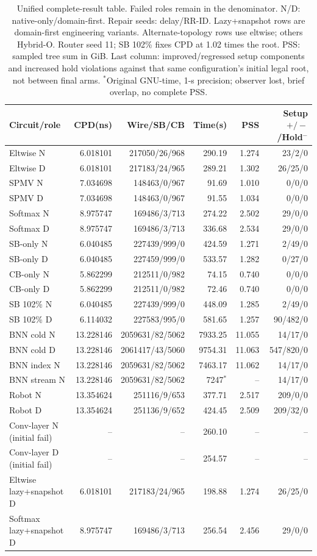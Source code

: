 \documentclass[conference,10pt]{IEEEtran}
\begin{document}
\begin{table}[t]
\centering\footnotesize\setlength{\tabcolsep}{3 pt}
\caption{Unified complete-result table. Failed roles remain in the denominator. N/D: native-only/domain-first. Repair seeds: delay/RR-ID. Lazy+snapshot rows are domain-first engineering variants. Alternate-topology rows use eltwise; others Hybrid-O. Router seed 11; SB 102\% fixes CPD at 1.02 times the root. PSS: sampled tree sum in GiB. Last column: improved/regressed setup components and increased hold violations against that same configuration's initial legal root, not between final arms. $^{*}$Original GNU-time, 1-s precision; observer lost, brief overlap, no complete PSS.}
\label{tab:completecost}
\begin{tabular}{lrrrrr}\hline
Circuit/role & CPD(ns) & Wire/SB/CB & Time(s) & PSS & Setup $+/-$/Hold$^-$\\\hline
Eltwise N&6.018101&217050/26/968&290.19&1.274&23/2/0\\
Eltwise D&6.018101&217183/24/965&289.21&1.302&26/25/0\\
SPMV N&7.034698&148463/0/967&91.69&1.010&0/0/0\\
SPMV D&7.034698&148463/0/967&91.55&1.034&0/0/0\\
Softmax N&8.975747&169486/3/713&274.22&2.502&29/0/0\\
Softmax D&8.975747&169486/3/713&336.68&2.534&29/0/0\\
SB-only N&6.040485&227439/999/0&424.59&1.271&2/49/0\\
SB-only D&6.040485&227459/999/0&533.57&1.282&0/27/0\\
CB-only N&5.862299&212511/0/982&74.15&0.740&0/0/0\\
CB-only D&5.862299&212511/0/982&72.46&0.740&0/0/0\\
SB 102\% N&6.040485&227439/999/0&448.09&1.285&2/49/0\\
SB 102\% D&6.114032&227583/995/0&581.65&1.257&90/482/0\\
BNN cold N&13.228146&2059631/82/5062&7933.25&11.055&14/17/0\\
BNN cold D&13.228146&2061417/43/5060&9754.31&11.063&547/820/0\\
BNN index N&13.228146&2059631/82/5062&7463.17&11.062&14/17/0\\
BNN stream N&13.228146&2059631/82/5062&7247$^{*}$&--&14/17/0\\
Robot N&13.354624&251116/9/653&377.71&2.517&209/0/0\\
Robot D&13.354624&251136/9/652&424.45&2.509&209/32/0\\
Conv-layer N (initial fail)&--&--&260.10&--&--\\
Conv-layer D (initial fail)&--&--&254.57&--&--\\
Eltwise lazy+snapshot D&6.018101&217183/24/965&198.88&1.274&26/25/0\\
Softmax lazy+snapshot D&8.975747&169486/3/713&256.54&2.456&29/0/0\\\hline
\end{tabular}
\end{table}
\end{document}
